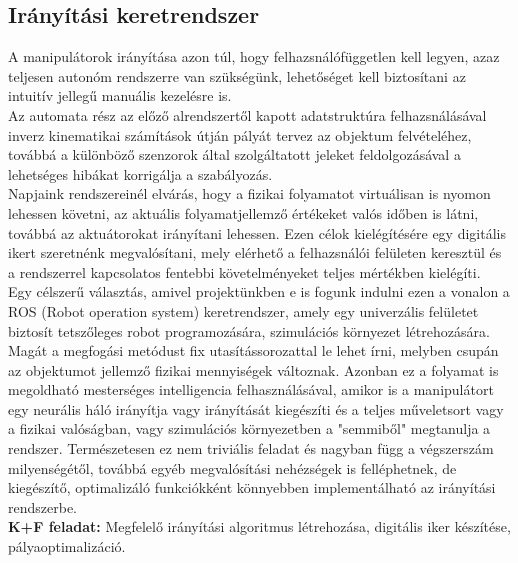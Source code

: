 \documentclass{article}
\begin{document}
\subsection{Irányítási keretrendszer}
A manipulátorok irányítása azon túl, hogy felhazsnálófüggetlen kell legyen, azaz teljesen
autonóm rendszerre van szükségünk, lehetőséget kell biztosítani az intuitív jellegű manuális kezelésre is.\\
Az automata rész az előző alrendszertől kapott adatstruktúra felhazsnálásával
inverz kinematikai számítások útján pályát tervez az objektum felvételéhez, továbbá
a különböző szenzorok által szolgáltatott jeleket feldolgozásával a lehetséges hibákat
korrigálja a szabályozás.\\
Napjaink rendszereinél elvárás, hogy a fizikai folyamatot virtuálisan is nyomon lehessen követni,
az aktuális folyamatjellemző értékeket valós időben is látni, továbbá az aktuátorokat irányítani lehessen.
Ezen célok kielégítésére egy digitális ikert szeretnénk megvalósítani, mely elérhető a 
felhazsnálói felületen keresztül és a rendszerrel kapcsolatos fentebbi követelményeket
teljes mértékben kielégíti.\\
Egy célszerű választás, amivel projektünkben e is fogunk indulni ezen a vonalon a 
ROS (Robot operation system) keretrendszer, amely egy univerzális felületet biztosít
tetszőleges robot programozására, szimulációs környezet létrehozására.\vspace{5pt}\\
Magát a megfogási metódust fix utasítássorozattal le lehet írni, melyben csupán az objektumot
jellemző fizikai mennyiségek változnak. Azonban ez a folyamat is megoldható mesterséges intelligencia
felhasználásával, amikor is a manipulátort egy neurális háló irányítja vagy irányítását kiegészíti
és a teljes műveletsort vagy a fizikai valóságban, vagy szimulációs környezetben a "semmiből"
megtanulja a rendszer. Természetesen ez nem triviális feladat és nagyban függ a végszerszám
milyenségétől, továbbá egyéb megvalósítási nehézségek is felléphetnek, de kiegészítő, optimalizáló
funkciókként könnyebben implementálható az irányítási rendszerbe.\vspace{5pt}\\
\textbf{K+F feladat: }Megfelelő irányítási algoritmus létrehozása, digitális iker készítése,
pályaoptimalizáció. 
\end{document}
